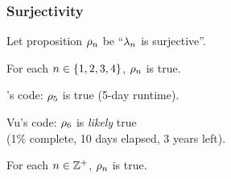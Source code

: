 \documentclass[letterpaper, 14pt]{extarticle}
\begin{document}
\begin{flushleft}

\subsubsection{Surjectivity}

\begin{definition}
Let proposition $\rho_{n}$ be ``$\lambda_{n}$ is surjective''.
\end{definition}

\begin{remark}
For each $n \in \{1, 2, 3, 4\}$, $\rho_{n}$ is true.
\end{remark}

\begin{remark}
\cm's code: $\rho_{5}$ is true (5-day runtime).
\end{remark}

\begin{remark}
Vu's code: $\rho_{6}$ is \emph{likely} true \\
(1\% complete, 10 days elapsed, 3 years left).
\end{remark}

\begin{conjecture}
For each $n \in \mathbb{Z}^+$, $\rho_{n}$ is true.
\end{conjecture}


\end{flushleft}
\end{document}
